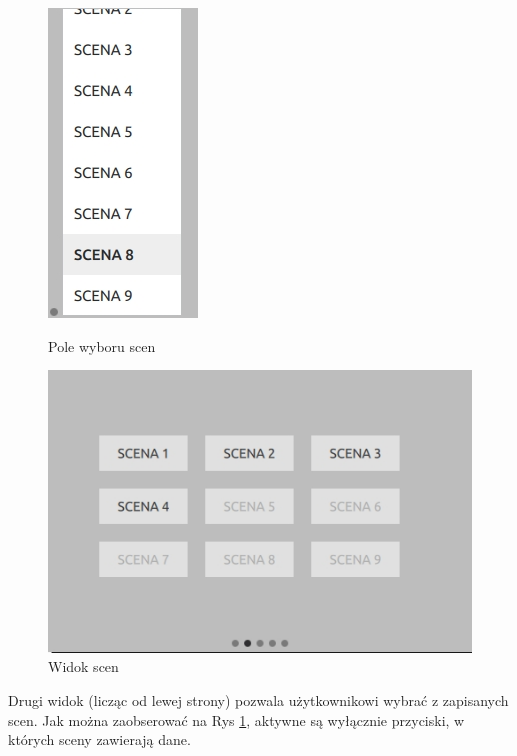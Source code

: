 \documentclass[12pt, eng, twoside, openany, final]{mgr}
\begin{document}
            \begin{figure}[!h]
        	\centering
        	\begin{minipage}[t]{3cm}
        		\centering
        		\includegraphics[scale=0.4]{ui_box.jpg}
        		\caption{Pole wyboru scen} \label{fig:box} 
        	\end{minipage}
        	\hspace{3cm}
        	\begin{minipage}[t]{5cm}
        		\centering
        		\includegraphics[scale=0.4]{ui_sceneTAB.jpg}
        		\caption{Widok scen} \label{fig:scene} 
        	\end{minipage}
        \end{figure}
            
        Drugi widok (licząc od lewej strony) pozwala użytkownikowi wybrać z zapisanych scen. Jak można zaobserować na Rys \ref{fig:scene}, aktywne są wyłącznie przyciski, w których sceny zawierają dane.
        \newpage 
        
\end{document}
